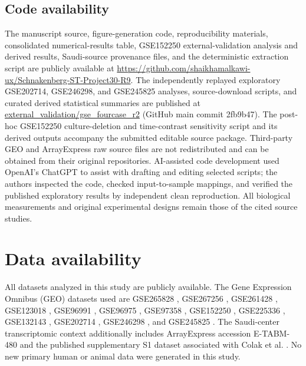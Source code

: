 \documentclass[preprint,11pt]{elsarticle}
\begin{document}
\subsection{Code availability}
The manuscript source, figure-generation code, reproducibility materials, consolidated numerical-results table, GSE152250 external-validation analysis and derived results, Saudi-source provenance files, and the deterministic extraction script are publicly available at \href{https://github.com/shaikhamalkawi-ux/Schnakenberg-ST-Project30-R9}{https://github.com/shaikhamalkawi-ux/Schnakenberg-ST-Project30-R9}. The independently replayed exploratory GSE202714, GSE246298, and GSE245825 analyses, source-download scripts, and curated derived statistical summaries are published at \href{https://github.com/shaikhamalkawi-ux/Schnakenberg-ST-Project30-R9/tree/main/external_validation/gse_fourcase_r2}{external\_validation/gse\_fourcase\_r2} (GitHub main commit 2fb9b47). The post-hoc GSE152250 culture-deletion and time-contrast sensitivity script and its derived outputs accompany the submitted editable source package. Third-party GEO and ArrayExpress raw source files are not redistributed and can be obtained from their original repositories. AI-assisted code development used OpenAI's ChatGPT to assist with drafting and editing selected scripts; the authors inspected the code, checked input-to-sample mappings, and verified the published exploratory results by independent clean reproduction. All biological measurements and original experimental designs remain those of the cited source studies.


\section*{Data availability}
All datasets analyzed in this study are publicly available. The Gene Expression Omnibus (GEO) datasets used are GSE265828 \cite{GEO265828}, GSE267256 \cite{GEO267256}, GSE261428 \cite{GEO261428}, GSE123018 \cite{GEO123018}, GSE96991 \cite{GEO96991}, GSE96975 \cite{GEO96975}, GSE97358 \cite{GEO97358}, GSE152250 \cite{GEO152250}, GSE225336 \cite{GEO225336}, GSE132143 \cite{GEO132143}, GSE202714 \cite{Moita2022}, GSE246298 \cite{Hata2025}, and GSE245825 \cite{Hata2025}. The Saudi-center transcriptomic context additionally includes ArrayExpress accession E-TABM-480 \cite{ArrayExpressETABM480} and the published supplementary S1 dataset associated with Colak et al. \cite{ColakS1Data}. No new primary human or animal data were generated in this study.
\end{document}
